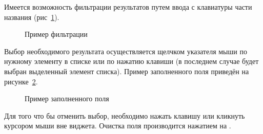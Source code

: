 Имеется возможность фильтрации результатов путем ввода с клавиатуры части названия (рис~\ref{img:widgect:autocomplete_filter_view}).
\begin{figure}[H]
	\caption{Пример фильтрации}
	\label{img:widgect:autocomplete_filter_view}
\end{figure}

Выбор необходимого результата осуществляется щелчком указателя мыши по нужному элементу в списке или по нажатию клавиши \keys{\enter} (в последнем случае будет выбран выделенный элемент списка). Пример заполненного поля приведён на рисунке~\ref{img:widgect:autocomplete_complete}.
\begin{figure}[H]
	\caption{Пример заполненного поля}
	\label{img:widgect:autocomplete_complete}
\end{figure}

 Для того что бы отменить выбор, необходимо нажать клавишу \keys{\esc} или кликнуть курсором мыши вне виджета. Очистка поля производится нажатием на .
